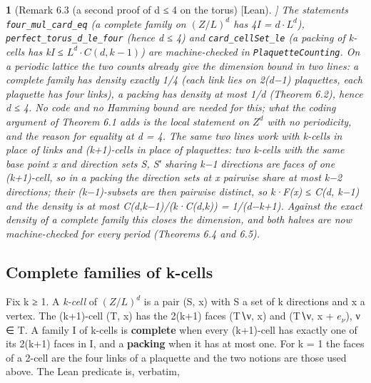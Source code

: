 \documentclass[11pt,a4paper]{article}
\theoremstyle{named}
\newtheorem*{namedthm}{}
\begin{document}
\begin{namedthm}[Remark 6.3 (a second proof of d ≤ 4 on the torus) [Lean]]
The statements \texttt{four\_\allowbreak{}mul\_\allowbreak{}card\_\allowbreak{}eq} (a complete family on $(Z/L)^d$ has 4\textbar{}I\textbar{} = $d·L^d$), \texttt{perfect\_\allowbreak{}torus\_\allowbreak{}d\_\allowbreak{}le\_\allowbreak{}four} (hence d ≤ 4) and \texttt{card\_\allowbreak{}cellSet\_\allowbreak{}le} (a packing of k-cells has k\textbar{}I\textbar{} ≤ $L^d·C(d,k−1)$) are machine-checked in \texttt{PlaquetteCounting}. On a periodic lattice the two counts already give the dimension bound in two lines: a complete family has density exactly 1/4 (each link lies on 2(d−1) plaquettes, each plaquette has four links), a packing has density at most 1/d (Theorem 6.2), hence d ≤ 4. No code and no Hamming bound are needed for this; what the coding argument of Theorem 6.1 adds is the local statement on $Z^d$ with no periodicity, and the reason for equality at d = 4. The same two lines work with k-cells in place of links and (k+1)-cells in place of plaquettes: two k-cells with the same base point x and direction sets S, S′ sharing k−1 directions are faces of one (k+1)-cell, so in a packing the direction sets at x pairwise share at most k−2 directions; their (k−1)-subsets are then pairwise distinct, so k·\textbar{}F(x)\textbar{} ≤ C(d, k−1) and the density is at most C(d,k−1)/(k·C(d,k)) = 1/(d−k+1). Against the exact density of a complete family this closes the dimension, and both halves are now machine-checked for every period (Theorems 6.4 and 6.5).
\end{namedthm}

\subsection*{Complete families of k-cells}
Fix k ≥ 1. A \textit{k-cell} of $(Z/L)^d$ is a pair (S, x) with S a set of k directions and x a vertex. The (k+1)-cell (T, x) has the 2(k+1) faces (T∖ν, x) and (T∖ν, x + $e_{ν}$), ν ∈ T. A family I of k-cells is \textbf{complete} when every (k+1)-cell has exactly one of its 2(k+1) faces in I, and a \textbf{packing} when it has at most one. For k = 1 the faces of a 2-cell are the four links of a plaquette and the two notions are those used above. The Lean predicate is, verbatim,
\end{document}
